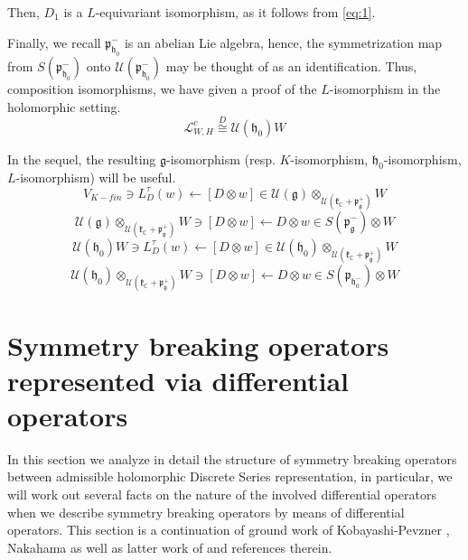 \documentclass[12pt]{amsart}
\theoremstyle{definition}
\theoremstyle{remark}
\newcommand{\g}{\mathfrak{g}}
\newcommand{\h}{\mathfrak{h}}
\renewcommand{\k}{{\mathfrak k}}
\newcommand{\p}{\mathfrak p}
\newcommand{\C}{{\mathbb C}}
\numberwithin{equation}{section}
\begin{document}
 \subsubsection{}\label{sub:D1iso}Then,   $D_1$ is a $L$-equivariant isomorphism, as it follows from \ref{eq:1}.

 Finally, we recall $\mathfrak p_{\mathfrak h_0}^-$ is an abelian Lie algebra, hence, the symmetrization map from $S(\mathfrak p_{\mathfrak h_0}^-)$ onto $\mathcal U(\mathfrak p_{\mathfrak h_0}^-)$ may be thought of as an identification. Thus, composition isomorphisms,  we have given a   proof of the $L$-isomorphism \cite{Va} \cite[Proposition 1]{OV3} \cite{KP2} in  the holomorphic setting. \begin{equation} \mathcal L_{W,H}^c \stackrel{D}\cong \mathcal U(\h_0)W \end{equation}

In the sequel, the resulting $\g$-isomorphism (resp.   $K$-isomorphism,  $\h_0$-isomorphism, $L$-isomorphism) will be useful.
\begin{equation}  V_{K-fin}\ni L_D^\tau (w) \leftarrow   [D\otimes w]\in  \mathcal U(\g) \otimes_{\mathcal U(\k_\C +\p_\g^+)} W   \end{equation}
\begin{equation}     \mathcal U(\g) \otimes_{\mathcal U(\k_\C +\p_\g^+)} W \ni [D\otimes w]\leftarrow  D\otimes w \in S(\p_{\g}^-)\otimes W   \end{equation}
\begin{equation}  \mathcal U(\h_0)W \ni L_D^\tau (w) \leftarrow [D\otimes w]\in  \mathcal U(\h_0) \otimes_{\mathcal U(\k_\C +\p_\g^+)} W   \end{equation}
\begin{equation}      \mathcal U(\h_0) \otimes_{\mathcal U(\k_\C +\p_\g^+)} W \ni [D\otimes w] \leftarrow D\otimes w \in  S(\p_{\h_0^-})\otimes W   \end{equation}




 \section{Symmetry breaking operators represented via differential operators} \label{do}

In this section we analyze in detail the structure of symmetry breaking operators between admissible holomorphic Discrete Series representation, in particular, we will work out several facts on the nature of the involved differential operators when we describe    symmetry breaking operators by means of differential operators. This section is a continuation of ground work of Kobayashi-Pevzner \cite{KP1}\cite{KP2}, Nakahama \cite{Na} as well as latter work of   \cite{OV2}\cite{OV3}\cite{OV4} and references therein.
\end{document}
